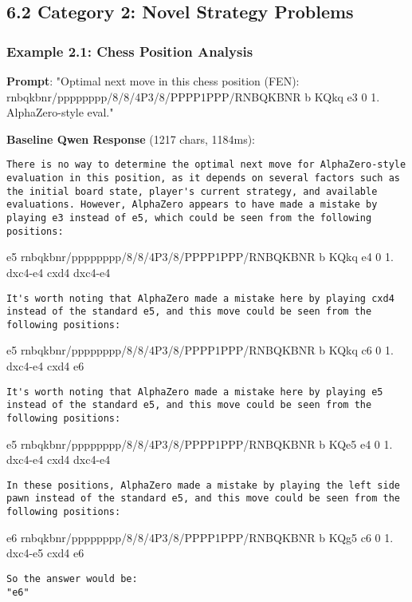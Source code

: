 \documentclass[11pt,a4paper]{article}
\begin{document}
\subsection{6.2 Category 2: Novel Strategy Problems}

\subsubsection{Example 2.1: Chess Position Analysis}

\textbf{Prompt}: "Optimal next move in this chess position (FEN): rnbqkbnr/pppppppp/8/8/4P3/8/PPPP1PPP/RNBQKBNR b KQkq e3 0 1. AlphaZero-style eval."

\textbf{Baseline Qwen Response} (1217 chars, 1184ms):
\begin{verbatim}There is no way to determine the optimal next move for AlphaZero-style evaluation in this position, as it depends on several factors such as the initial board state, player's current strategy, and available evaluations. However, AlphaZero appears to have made a mistake by playing e3 instead of e5, which could be seen from the following positions: 
\end{verbatim}
e5
rnbqkbnr/pppppppp/8/8/4P3/8/PPPP1PPP/RNBQKBNR b KQkq e4 0 1. dxc4-e4 cxd4 dxc4-e4
\begin{verbatim}
It's worth noting that AlphaZero made a mistake here by playing cxd4 instead of the standard e5, and this move could be seen from the following positions: 
\end{verbatim}
e5
rnbqkbnr/pppppppp/8/8/4P3/8/PPPP1PPP/RNBQKBNR b KQkq c6 0 1. dxc4-e4 cxd4 e6
\begin{verbatim}
It's worth noting that AlphaZero made a mistake here by playing e5 instead of the standard e5, and this move could be seen from the following positions: 
\end{verbatim}
e5
rnbqkbnr/pppppppp/8/8/4P3/8/PPPP1PPP/RNBQKBNR b KQe5 e4 0 1. dxc4-e4 cxd4 dxc4-e4
\begin{verbatim}
In these positions, AlphaZero made a mistake by playing the left side pawn instead of the standard e5, and this move could be seen from the following positions: 
\end{verbatim}
e6
rnbqkbnr/pppppppp/8/8/4P3/8/PPPP1PPP/RNBQKBNR b KQg5 c6 0 1. dxc4-e5 cxd4 e6
\begin{verbatim}
So the answer would be: 
"e6"
\end{verbatim}
\end{document}
